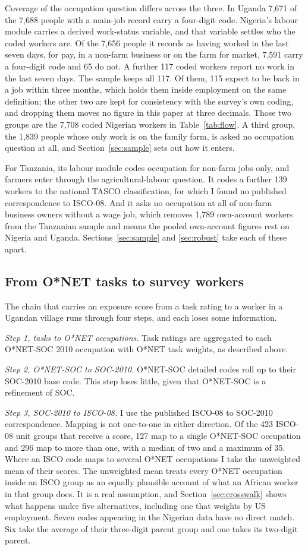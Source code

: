 Coverage of the occupation question differs across the three. In Uganda 7,671 of
the 7,688 people with a main-job record carry a four-digit code. Nigeria's
labour module carries a derived work-status variable, and that variable
settles who the coded workers are. Of the 7,656 people it records as
having worked in the last seven days, for pay, in a non-farm business or on the
farm for market, 7,591 carry a four-digit code and 65 do not. A further 117
coded workers report no work in the last seven days. The sample keeps all 117.
Of them, 115 expect to be back in a job within three months, which holds them
inside employment on the same definition; the other two are kept for
consistency with the survey's own coding, and dropping them moves no figure in
this paper at three decimals. Those two groups are the 7,708 coded Nigerian
workers in
Table~\ref{tab:flow}. A third group, the 1,839 people whose only work is on the
family farm, is asked no occupation question at all, and
Section~\ref{sec:sample} sets out how it enters.

For Tanzania, its labour module codes occupation
for non-farm jobs only, and farmers enter through the agricultural-labour
question. It codes a further 139 workers to the national TASCO classification, 
for which I found no
published correspondence to ISCO-08. And it asks no occupation at all of non-farm business
owners without a wage job, which removes 1,789 own-account workers from the
Tanzanian sample and means the pooled own-account figures rest on Nigeria and
Uganda. Sections~\ref{sec:sample} and \ref{sec:robust} take each of these apart.

\subsection{From O*NET tasks to survey workers}

The chain that carries an exposure score from a task rating to a worker in a
Ugandan village runs through four steps, and each loses some information.

\emph{Step 1, tasks to O*NET occupations.} Task ratings are aggregated to each
O*NET-SOC 2010 occupation with O*NET task weights, as described above.

\emph{Step 2, O*NET-SOC to SOC-2010.} O*NET-SOC detailed codes roll up to their
SOC-2010 base code. This step loses little, given that O*NET-SOC is a refinement
of SOC.

\emph{Step 3, SOC-2010 to ISCO-08.} I use the published ISCO-08 to SOC-2010
correspondence. Mapping is not one-to-one in either direction. Of the 423
ISCO-08 unit groups that receive a score, 127 map to a single O*NET-SOC
occupation and 296 map to more than one, with a median of two and a maximum of
35. Where an ISCO code maps to several O*NET occupations I take the unweighted
mean of their scores. The unweighted mean treats every O*NET occupation inside
an ISCO group as an equally plausible account of what an African worker in that
group does. It is a real assumption, and Section~\ref{sec:crosswalk} shows what
happens under five alternatives, including one that weights by US employment.
Seven codes appearing in the Nigerian data have no direct match. Six take the
average of their three-digit parent group and one takes its two-digit parent.

